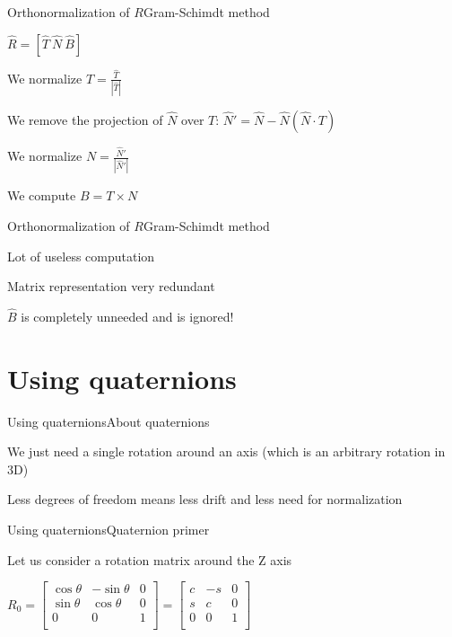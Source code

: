 \documentclass{beamer}
\begin{document}
\begin{slide}{Orthonormalization of $R$}{Gram-Schimdt method}{
\item $\hat R = [\hat T\ \hat N\ \hat B]$
\item We normalize $T = \frac{\hat T}{|\hat T|}$
\item We remove the projection of $\hat N$ over $T$: $\hat N' = \hat N - \hat N (\hat N \cdot T)$
\item We normalize $N = \frac{\hat N'}{|\hat N'|}$
\item We compute $B = T \times N$
}\end{slide}

\begin{slide}{Orthonormalization of $R$}{Gram-Schimdt method}{
\item Lot of useless computation
\item Matrix representation very redundant
\item $\hat B$ is completely unneeded and is ignored!
}\end{slide}

\section{Using quaternions}
\begin{slide}{Using quaternions}{About quaternions}{
\item We just need a single rotation around an axis (which is an arbitrary rotation in 3D)
\item Less degrees of freedom means less drift and less need for normalization
}\end{slide}

\begin{slide}{Using quaternions}{Quaternion primer}{
\item Let us consider a rotation matrix around the Z axis
\item $R_0 = \left[ \begin{matrix}
\cos \theta & -\sin \theta & 0 \\
\sin \theta & \cos \theta & 0 \\
0 & 0 & 1\\
\end{matrix} \right] = 
\left[ \begin{matrix}
c & -s & 0 \\
s & c & 0 \\
0 & 0 & 1 \\
\end{matrix} \right]$
}\end{slide}
\end{document}
